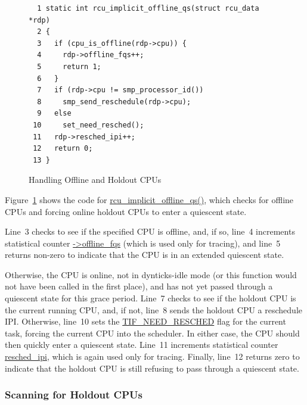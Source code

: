 \begin{figure}[tbp]
{ \scriptsize
\begin{verbatim}
  1 static int rcu_implicit_offline_qs(struct rcu_data *rdp)
  2 {
  3   if (cpu_is_offline(rdp->cpu)) {
  4     rdp->offline_fqs++;
  5     return 1;
  6   }
  7   if (rdp->cpu != smp_processor_id())
  8     smp_send_reschedule(rdp->cpu);
  9   else
 10     set_need_resched();
 11   rdp->resched_ipi++;
 12   return 0;
 13 }
\end{verbatim}
}
\caption{Handling Offline and Holdout CPUs}
\label{fig:app:rcuimpl:rcutreewt:Handling Offline and Holdout CPUs}
\end{figure}

Figure~\ref{fig:app:rcuimpl:rcutreewt:Handling Offline and Holdout CPUs}
shows the code for \url{rcu_implicit_offline_qs()}, which checks for
offline CPUs and forcing online holdout CPUs to enter a quiescent state.

Line~3 checks to see if the specified CPU is offline, and, if so,
line~4 increments statistical counter \url{->offline_fqs} (which is
used only for tracing), and line~5 returns non-zero to indicate
that the CPU is in an extended quiescent state.

Otherwise, the CPU is online, not in dynticks-idle mode (or this
function would not have been called in the first place), and has
not yet passed through a quiescent state for this grace period.
Line~7 checks to see if the holdout CPU is the current running
CPU, and, if not, line~8 sends the holdout CPU a reschedule IPI.
Otherwise, line~10 sets the \url{TIF_NEED_RESCHED} flag for the
current task, forcing the current CPU into the scheduler.
In either case, the CPU should then quickly enter a quiescent
state.
Line~11 increments statistical counter \url{resched_ipi}, which is
again used only for tracing.
Finally, line~12 returns zero to indicate that the holdout CPU is
still refusing to pass through a quiescent state.

\subsubsection{Scanning for Holdout CPUs}
\label{app:rcuimpl:rcutreewt:Scanning for Holdout CPUs}

